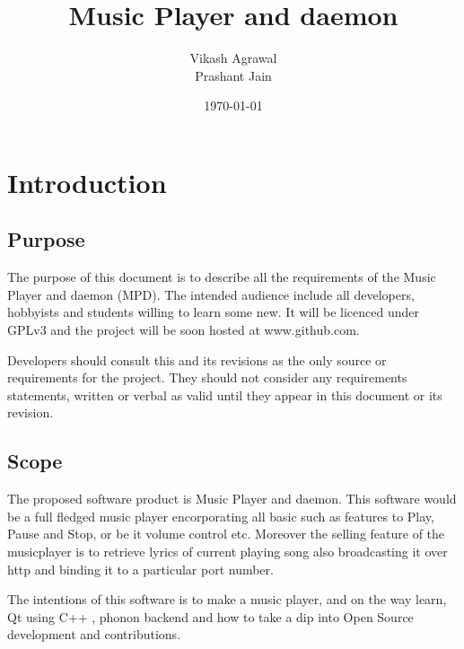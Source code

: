 

\title{Music Player and daemon}
\author{Vikash Agrawal\\Prashant Jain}
\date{\today}
\cleardoublepage

\vspace{50 mm}
\pagestyle{empty}
\maketitle
\pagebreak
\tableofcontents
\pagebreak
\section{Introduction}


\subsection{Purpose}
The purpose of this document is to describe all the requirements of the Music Player and daemon (MPD).
The intended audience include all developers, hobbyists and students willing to learn some new.
It will be licenced under GPLv3 and the project will be soon hosted at www.github.com.

Developers should consult this and its revisions as the only source or requirements for the project.
They should not consider any requirements statements, written or verbal as valid until they appear in this document or its revision.

\subsection{Scope}
The proposed software product is Music Player and daemon. This software would be a full fledged
music player encorporating all basic such as features to Play, Pause and Stop, or be it volume control etc. 
Moreover the selling feature of the musicplayer is to retrieve lyrics of current playing song also
broadcasting it over http and binding it to a particular port number.

The intentions of this software is to make a music player, and on the way learn, Qt using C++
, phonon backend and how to take a dip into Open Source development and contributions.

